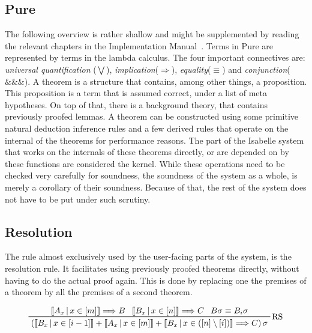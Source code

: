 \subsection{Pure}
The following overview is rather shallow and might be supplemented by reading the relevant chapters in the Implementation Manual~\parencite{implementation}. Terms in Pure are represented by terms in the lambda calculus. The four important connectives are: \textit{universal quantification} ($\bigvee$), \textit{implication}($\Longrightarrow$), \textit{equality}($\equiv$) and \textit{conjunction}($\&\&\&$).\newline
A theorem is a structure that contains, among other things, a proposition. This proposition is a term that is assumed correct, under a list of meta hypotheses. On top of that, there is a background theory, that contains previously proofed lemmas. A theorem can be constructed using some primitive natural deduction inference rules and a few derived rules that operate on the internal of the theorems for performance reasons.\newline
The part of the Isabelle system that works on the internals of these theorems directly, or are depended on by these functions are considered the kernel. While these operations need to be checked very carefully for soundness, the soundness of the system as a whole, is merely a corollary of their soundness. Because of that, the rest of the system does not have to be put under such scrutiny.
\subsection{Resolution}
The rule almost exclusively used by the user-facing parts of the system, is the resolution rule. It facilitates using previously proofed theorems directly, without having to do the actual proof again. This is done by replacing one the premises of a theorem by all the premises of a second theorem.

\begin{displaymath}\label{res}
    \prftree[r]{RS}
    {\left\llbracket A_x\,\middle|\, x \in \left[ m \right] \right\rrbracket \Longrightarrow B}
    {\left\llbracket B_x\,\middle|\, x \in \left[ n \right] \right\rrbracket \Longrightarrow C}
    {B\sigma \equiv B_i\sigma}
    {\left( \left\llbracket B_x\,\middle|\, x \in \left[ i - 1 \right] \right\rrbracket
    + \left\llbracket A_x\,\middle|\, x \in \left[ m \right] \right\rrbracket
    + \left\llbracket B_x\,\middle|\, x \in \left( \left[ n \right] \setminus \left[ i \right] \right) \right\rrbracket
    \Longrightarrow C \right) \sigma
    }
\end{displaymath}

